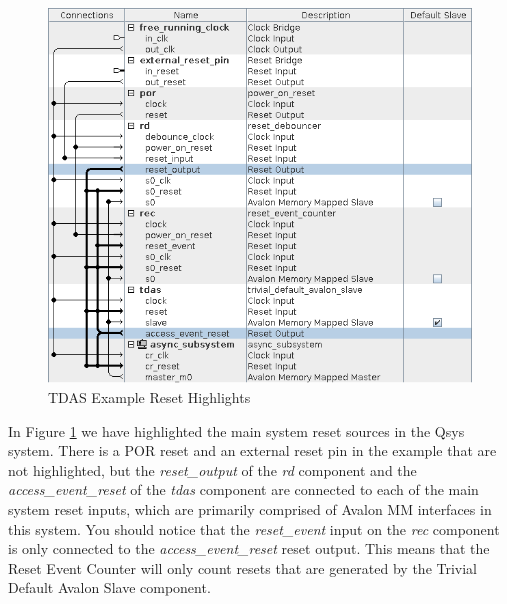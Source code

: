 \documentclass{article}
\begin{document}
\begin{flushleft}
\begin{figure}[H]
\centering
\includegraphics[scale=0.675]{tdas_resets}
\caption{TDAS Example Reset Highlights}
\label{fig:tdas_resets}
\end{figure}

In Figure \ref{fig:tdas_resets} we have highlighted the main system reset sources in the Qsys system.  There is a POR reset and an external reset pin in the example that are not highlighted, but the \emph{reset\_output} of the \emph{rd} component and the \emph{access\_event\_reset} of the \emph{tdas} component are connected to each of the main system reset inputs, which are primarily comprised of Avalon MM interfaces in this system.  You should notice that the \emph{reset\_event} input on the \emph{rec} component is only connected to the \emph{access\_event\_reset} reset output.  This means that the Reset Event Counter will only count resets that are generated by the Trivial Default Avalon Slave component.


\end{flushleft}
\end{document}
